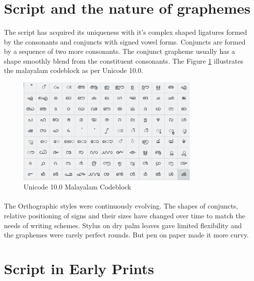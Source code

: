 \documentclass[10pt]{article}
\begin{document}
\section{Script and the nature of graphemes}

\paragraph{}
The script has acquired its uniqueness with it's complex shaped ligatures formed by the consonants and conjuncts with signed vowel forms. Conjuncts are formed by a sequence of two more consonants. The conjunct grapheme usually has a shape smoothly blend from the constituent consonants. The Figure \ref{unicode} illustrates the malayalam codeblock as per Unicode 10.0. 


\begin{figure}[h!]
	\centering
	\includegraphics[width=0.8\textwidth]{images/unicodeml.png}
	\caption{Unicode 10.0 Malayalam Codeblock}
	\label{unicode}
\end{figure} 


\paragraph{}

 The Orthographic styles were continuously evolving. The shapes of conjuncts, relative positioning of signs and their sizes have changed over time to match the needs of writing schemes. Stylus on dry palm leaves gave limited flexibility and the graphemes were rarely perfect rounds. But pen on paper made it more curvy. 


\section{Script in Early Prints }
\end{document}
